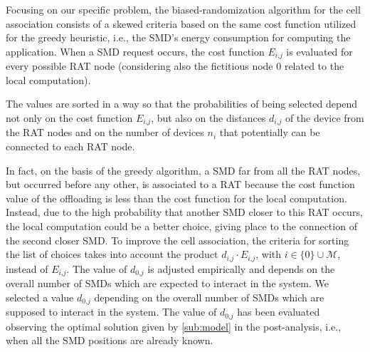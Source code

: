 \documentclass[twoside,openright]{report}
\begin{document}
Focusing on our specific problem, the biased-randomization algorithm for the cell association consists of a skewed criteria based on the same cost function utilized for the greedy heuristic, i.e., the \gls{SMD}'s energy consumption for computing the application.
When a \gls{SMD} request occurs, the cost function $E_\textit{i,j}$ is evaluated for every possible \gls{RAT} node (considering also the fictitious node $0$ related to the local computation).

The values are sorted in a way so that the probabilities of being selected depend not only on the cost function $E_\textit{i,j}$, but also on the distances $d_\textit{i,j}$ of the device from the \gls{RAT} nodes and on the number of devices $n_i$ that potentially can be connected to each \gls{RAT}  node. 

In fact, on the basis of the greedy algorithm, a \gls{SMD} far from all the \gls{RAT} nodes, but occurred before any other, is associated to a \gls{RAT} because the cost function value of the offloading is less than the cost function for the local computation. 
Instead, due to the high probability that another \gls{SMD} closer to this \gls{RAT} occurs, the local computation could be a better choice, giving place to the connection of the second closer \gls{SMD}.
To improve the cell association, the criteria for sorting the list of choices takes into account the product $d_\textit{i,j} \cdot E_\textit{i,j}$, with $i \in \{{0\}} \cup \mathcal{M}$, instead of $E_\textit{i,j}$. 
The value of $d_\textit{0,j}$ is adjusted empirically and depends on the overall number of \glspl{SMD} which are expected to interact in the system.
We selected a value $d_\textit{0,j}$ depending on the overall number of \glspl{SMD} which are supposed to interact in the system.
The value of $d_\textit{0,j}$ has been evaluated observing  the optimal solution given by \ref{sub:model} in the post-analysis, i.e.,  when all the \gls{SMD} positions are already known. 
\end{document}
